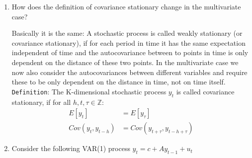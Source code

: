 \documentclass[a4paper]{scrartcl}
\begin{document}
\begin{enumerate}
\begin{solution}
\begin{align*}
\begin{pmatrix}
	E[(y_{1,t}- E[y_{1,t}])(y_{1,{t-h}} - E[y_{1,{t-h}}])] & \dots & E[(y_{1,t} - E[y_{1,t}])(y_{K,{t-h}} - E[y_{K,{t-h}}])]\\
	\vdots & \ddots & \vdots\\
	E[(y_{K,t}- E[y_{K,t}])(y_{1,{t-h}} - E[y_{1,{t-h}}])] & \dots & E[(y_{K,t} - E[y_{K,t}])(y_{K,{t-h}} - E[y_{K,{t-h}}])]
	\end{pmatrix}\\
	&=\begin{pmatrix}
	Cov(y_{1,t},y_{1,{t-h}}) & \dots & Cov(y_{1,t},y_{K,{t-h}})\\
	\vdots & \ddots & \vdots\\
	Cov(y_{K,t},y_{1,{t-h}}) & \dots & Cov(y_{K,t},y_{K,{t-h}})
	\end{pmatrix}
	\end{align*}
	On the diagonals we have the autocovariance of each variable, on the off-diagonals we have the covariances between the different variables.
\end{solution}
\item How does the definition of covariance stationary change in the multivariate case?
\begin{solution}
		Basically it is the same: A stochastic process is called weakly stationary (or covariance stationary), if for each period in time it has the same expectation independent of time and the autocovariance between to points in time is only dependent on the distance of these two points. In the multivariate case we now also consider the autocovariances between different variables and require these to be only dependent on the distance in time, not on time itself.\\
		\texttt{Definition}: The K-dimensional stochastic process $y_t$ is called covariance stationary, if for all $h,t,\tau \in \mathbb{Z}$:
		\begin{align}
		E[{y_t}] &= E[{y_\tau}]\\
		Cov(y_{t},y_{t-h}) &= Cov(y_{t+\tau}, y_{t-h+\tau}) \label{gammas}
		\end{align}
\end{solution}
\item Consider the following VAR(1) process $y_t = c + A y_{t-1} + u_t$
\begin{align*}

\end{align*}
\end{enumerate}
\end{document}

